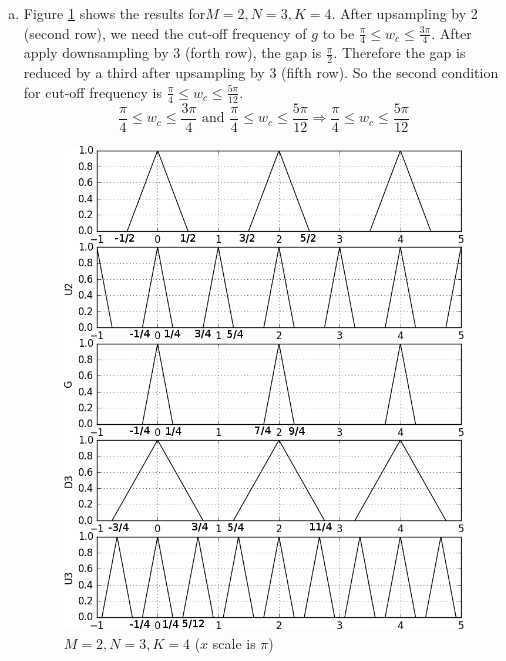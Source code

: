 \begin{enumerate}[(a)]
\item Figure \ref{fig:p2-2} shows the results for$M=2, N=3, K=4$. After upsampling by 2 (second row), we need the cut-off frequency of $g$ to be $\frac{\pi}{4} \leq w_c \leq \frac{3\pi}{4}$. After apply downsampling by 3 (forth row), the gap is $\frac{\pi}{2}$. Therefore the gap is reduced by a third after upsampling by 3 (fifth row). So the second condition for cut-off frequency is $\frac{\pi}{4} \leq w_c \leq \frac{5\pi}{12}$. 
\[\frac{\pi}{4} \leq w_c \leq \frac{3\pi}{4} \text{ and } \frac{\pi}{4} \leq w_c \leq \frac{5\pi}{12} \Rightarrow \frac{\pi}{4} \leq w_c \leq \frac{5\pi}{12}\]
\begin{figure}
	\centering
	\includegraphics[width=\textwidth]{images/p2-2}
	\caption{$M=2, N=3, K=4$ ($x$ scale is $\pi$)}
	\label{fig:p2-2}
\end{figure}


\end{enumerate}
